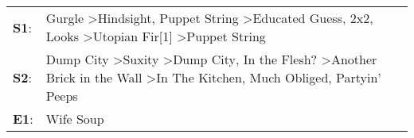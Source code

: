 \begin{supertabular}{p{0.03\textwidth}p{0.92\textwidth}}
 \textbf{S1}:  &                           Gurgle\textsuperscript{} \textgreater \enspace Hindsight\textsuperscript{}, \enspace Puppet String\textsuperscript{} \textgreater \enspace Educated Guess\textsuperscript{}, \enspace 2x2\textsuperscript{}, \enspace Looks\textsuperscript{} \textgreater \enspace Utopian Fir[1]\textsuperscript{} \textgreater \enspace Puppet String\textsuperscript{}  \enspace  \\
 \textbf{S2}:  &  Dump City\textsuperscript{} \textgreater \enspace Suxity\textsuperscript{} \textgreater \enspace Dump City\textsuperscript{}, \enspace In the Flesh?\textsuperscript{} \textgreater \enspace Another Brick in the Wall\textsuperscript{} \textgreater \enspace In The Kitchen\textsuperscript{}, \enspace Much Obliged\textsuperscript{}, \enspace Partyin' Peeps\textsuperscript{}  \enspace  \\
 \textbf{E1}:  &                                                                                                                                                                                                                                                                                                                                                          Wife Soup\textsuperscript{}  \enspace  \\
\end{supertabular}
